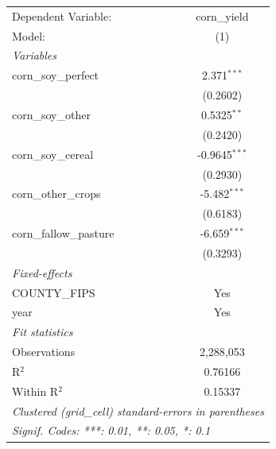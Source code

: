 
\begingroup
\centering
\begin{tabular}{lc}
   \tabularnewline \midrule \midrule
   Dependent Variable:     & corn\_yield\\   
   Model:                  & (1)\\  
   \midrule
   \emph{Variables}\\
   corn\_soy\_perfect      & 2.371$^{***}$\\   
                           & (0.2602)\\   
   corn\_soy\_other        & 0.5325$^{**}$\\   
                           & (0.2420)\\   
   corn\_soy\_cereal       & -0.9645$^{***}$\\   
                           & (0.2930)\\   
   corn\_other\_crops      & -5.482$^{***}$\\   
                           & (0.6183)\\   
   corn\_fallow\_pasture   & -6.659$^{***}$\\   
                           & (0.3293)\\   
   \midrule
   \emph{Fixed-effects}\\
   COUNTY\_FIPS            & Yes\\  
   year                    & Yes\\  
   \midrule
   \emph{Fit statistics}\\
   Observations            & 2,288,053\\  
   R$^2$                   & 0.76166\\  
   Within R$^2$            & 0.15337\\  
   \midrule \midrule
   \multicolumn{2}{l}{\emph{Clustered (grid\_cell) standard-errors in parentheses}}\\
   \multicolumn{2}{l}{\emph{Signif. Codes: ***: 0.01, **: 0.05, *: 0.1}}\\
\end{tabular}
\par\endgroup


